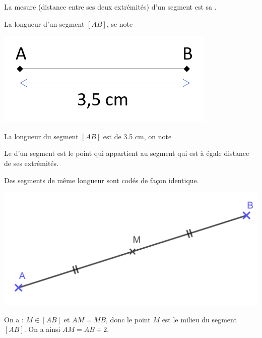 \begin{mydef}
	La mesure (distance entre ses deux extrémités) d'un segment est sa \hspace*{4cm}.
\end{mydef}

\begin{myprop}
	La longueur d'un segment $[AB]$, se note 
\end{myprop}

\begin{myex}
	\vspace*{-0.5cm}
	\begin{center}
		\includegraphics[scale=0.8]{img/lgr}
	\end{center}
	\vspace*{-0.5cm}
	La longueur du segment $[AB]$ est de \num{3.5} cm, on note
\end{myex}

\begin{mydef}
	Le \hspace*{4cm} d'un segment est le point qui appartient au segment  qui est à égale distance de ses extrémités.
\end{mydef}

\begin{myrem}
	Des segments de même longueur sont codés de façon identique.
\end{myrem}

\begin{myex}
	\begin{center}
		\includegraphics[scale=0.25]{img/milieu}
	\end{center}

	On a : $M \in [AB]$ et $AM = MB$, donc le point $M$ est le milieu du segment $[AB]$. On a ainsi $AM = AB \div 2$. 
\end{myex}